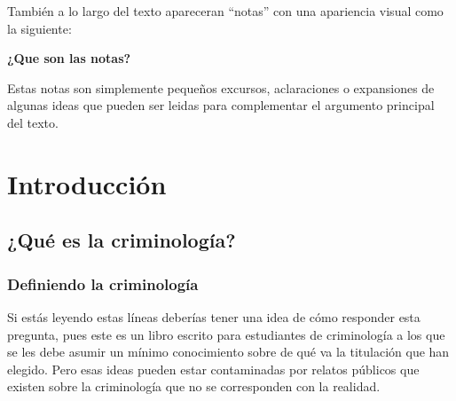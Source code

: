 \documentclass[
  spanish,
  letterpaper,
  DIV=11,
  numbers=noendperiod]{scrreprt}
\begin{document}
También a lo largo del texto apareceran ``notas'' con una apariencia
visual como la siguiente:

\begin{tcolorbox}[enhanced jigsaw, bottomtitle=1mm, toprule=.15mm, colbacktitle=quarto-callout-note-color!10!white, bottomrule=.15mm, leftrule=.75mm, colframe=quarto-callout-note-color-frame, opacitybacktitle=0.6, titlerule=0mm, breakable, colback=white, left=2mm, arc=.35mm, title=\textcolor{quarto-callout-note-color}{\faInfo}\hspace{0.5em}{Nota}, toptitle=1mm, coltitle=black, rightrule=.15mm, opacityback=0]

\textbf{¿Que son las notas?}

Estas notas son simplemente pequeños excursos, aclaraciones o
expansiones de algunas ideas que pueden ser leidas para complementar el
argumento principal del texto.

\end{tcolorbox}

\part{Introducción}

\chapter{¿Qué es la criminología?}\label{quuxe9-es-la-criminologuxeda}

\section{Definiendo la
criminología}\label{definiendo-la-criminologuxeda}

Si estás leyendo estas líneas deberías tener una idea de cómo responder
esta pregunta, pues este es un libro escrito para estudiantes de
criminología a los que se les debe asumir un mínimo conocimiento sobre
de qué va la titulación que han elegido. Pero esas ideas pueden estar
contaminadas por relatos públicos que existen sobre la criminología que
no se corresponden con la realidad.
\end{document}
